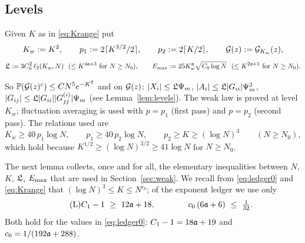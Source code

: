 \subsection{Levels}\label{sec:levels}
\begin{definition}\label{def:levels}
Given $K$ as in \eqref{eq:Krange} put
\[
 K_w:=K^2,\qquad p_1:=2\lceil K^{3/2}/2\rceil,\qquad p_2:=2\lceil K/2\rceil,\qquad\mathcal{G}(z):=\mathcal{G}_{K_w}(z),
\]
\[
 \mathfrak{L}:=3C_0^2\,\ell_2(K_w,N)\ \ (\le K^{4\mathfrak{a}+3}\text{ for }N\ge N_0),\qquad E_{\max}:=25K_w^{\mathfrak{a}}\sqrt{C_0\log N}\ \ (\le K^{2\mathfrak{a}+1}\text{ for }N\ge N_0).
\]
\end{definition}
\noindent So $\mathbb{P}(\mathcal{G}(z)^c)\le CN^5e^{-K^2}$ and on $\mathcal{G}(z)$: $|X_i|\le\mathfrak{L}\Psi_m$, $|A_i|\le\mathfrak{L}|G_{ii}|\Psi_m^2$, $|G_{ij}|\le\mathfrak{L}|G_{ii}||G^{(i)}_{jj}|\Psi_m$ (see Lemma~\ref{lem:levels}).
The weak law is proved at level $K_w$; fluctuation averaging is used with $p=p_1$ (first pass) and $p=p_2$ (second pass). The relations used are
\begin{equation}\label{eq:levelrel}
 K_w\ge40\,p_1\log N,\qquad p_1\ge40\,p_2\log N,\qquad p_2\ge K\ge(\log N)^3\qquad(N\ge N_0),
\end{equation}
which hold because $K^{1/2}\ge(\log N)^{3/2}\ge 41\log N$ for $N\ge N_0$.

The next lemma collects, once and for all, the elementary inequalities between $N$, $K$, $\mathfrak{L}$, $E_{\max}$ that are used in Section~\ref{sec:weak}. We recall from \eqref{eq:ledger0} and \eqref{eq:Krange} that $(\log N)^3\le K\le N^{c_0}$; of the exponent ledger we use only
\begin{equation}\tag{L}\label{eq:ledgerA3}
 C_1-1\ \ge\ 12\fa+18,\qquad\qquad c_0\,(6\fa+6)\ \le\ \tfrac1{32}.
\end{equation}
Both hold for the values in \eqref{eq:ledger0}: $C_1-1=18\mathfrak{a}+19$ and $c_0=1/(192\mathfrak{a}+288)$.

